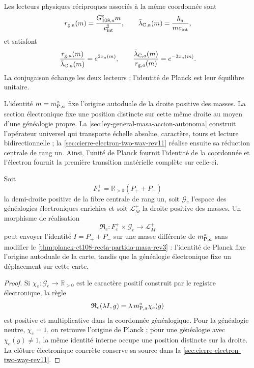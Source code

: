 Les lecteurs physiques réciproques associés à la même coordonnée sont
\[
 r_{{\rm g},a}(m)=\frac{G_{108,a}^{\circ}m}{c_{\rm int}^{2}},
 \qquad
 \bar\lambda_{{\rm C},a}(m)=\frac{\hbar_a}{mc_{\rm int}},
\]
et satisfont
\begin{equation}
 \frac{r_{{\rm g},a}(m)}{\bar\lambda_{{\rm C},a}(m)}
 =e^{2x_a(m)},
 \qquad
 \frac{\bar\lambda_{{\rm C},a}(m)}{r_{{\rm g},a}(m)}
 =e^{-2x_a(m)}.
 \label{eq:planck-ct108-lectores-exponenciales-rev3}
\end{equation}
La conjugaison échange les deux lecteurs ; l’identité de Planck est leur
équilibre unitaire.

\begin{exactbox}[title={Identité de Planck et clôture électronique}]
L'identité \(m=m_{{\rm P},a}^{\circ}\) fixe l'origine autoduale de la droite
positive des masses. La section électronique fixe une position distincte sur
cette même droite au moyen d'une généalogie propre. La
\cref{sec:ley-general-masa-accion-autonoma} construit l'opérateur universel
qui transporte échelle absolue, caractère, tours et lecture bidirectionnelle ;
la \cref{sec:cierre-electron-two-way-rev11} réalise ensuite sa réduction
centrale de rang un. Ainsi, l'unité de Planck fournit l'identité de
la coordonnée et l'électron fournit la première transition matérielle
complète sur celle-ci.
\end{exactbox}

\begin{proposition}
\label{prop:planck-ct108-realizacion-centro-electron-rev3}
Soit
\[
 F_e^+=\mathbb R_{>0}(P_++P_-)
\]
la demi-droite positive de la fibre centrale de rang un, soit
\(\mathcal G_e\) l’espace des généalogies
électroniques enrichies et soit \(\mathcal L_M^+\) la droite positive des
masses. Un morphisme de réalisation
\[
 \mathfrak R_e:
 F_e^+\times\mathcal G_e\longrightarrow\mathcal L_M^+
\]
peut envoyer l’identité \(I=P_++P_-\) sur une masse différente de
\(m_{{\rm P},a}^{\circ}\) sans modifier le
\cref{thm:planck-ct108-recta-partida-masa-rev3} : l’identité de Planck fixe
l’origine autoduale de la carte, tandis que la généalogie électronique fixe un
déplacement sur cette carte.
\end{proposition}

\begin{proof}
Si \(\chi_e:\mathcal G_e\to\mathbb R_{>0}\) est le caractère positif construit
par le registre électronique, la règle
\[
 \mathfrak R_e(\lambda I,g)
 =\lambda\,m_{{\rm P},a}^{\circ}\chi_e(g)
\]
est positive et multiplicative dans la coordonnée généalogique. Pour la généalogie
neutre, \(\chi_e=1\), on retrouve l'origine de Planck ; pour une généalogie avec
\(\chi_e(g)\ne1\), la même identité interne occupe une position distincte sur
la droite. La clôture électronique concrète conserve sa source dans la
\cref{sec:cierre-electron-two-way-rev11}.
\end{proof}

